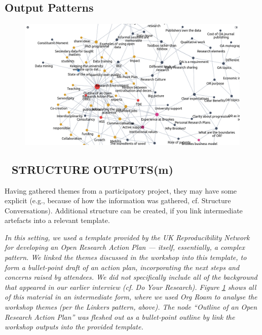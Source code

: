 \documentclass[acmlarge,timestamp]{acmart}
\newcommand{\motor}{(m)}
\begin{document}
\clearpage

\subsection{Output Patterns}

\begin{figure}
  \includegraphics[width=\textwidth,trim={0 0 0 2cm},clip=true]{org-roam-screenshot.png}
  \caption{\label{Org-Roam-Screenshot}}
\end{figure}

\subsection*{💎 STRUCTURE OUTPUTS{\hfill\motor}}
Having gathered themes from a participatory project, they may have
some explicit (e.g., because of how the information was gathered,
cf. {\sc Structure Conversations}).  Additional structure can be
created, if you link intermediate artefacts into a relevant template.

\smallskip

\noindent \emph{In this setting, we used a template provided by the UK
Reproducibility Network for developing an Open Research Action Plan
\cite{orap-template} — itself, essentially, a complex pattern.  We
linked the themes discussed in the workshop into this template, to
form a bullet-point draft of an action plan, incorporating the next
steps and concerns raised by attendees.  We did not specifically
include all of the background that appeared in our earlier interview
(cf. {\sc Do Your Research}).  Figure \ref{Org-Roam-Screenshot} shows
all of this material in an intermediate form, where we used Org Roam
to analyse the workshop themes (per the {\sc Linkers} pattern,
above). The node “Outline of an Open Research Action Plan” was fleshed
out as a bullet-point outline by link the workshop outputs into the
provided template.}
\end{document}

